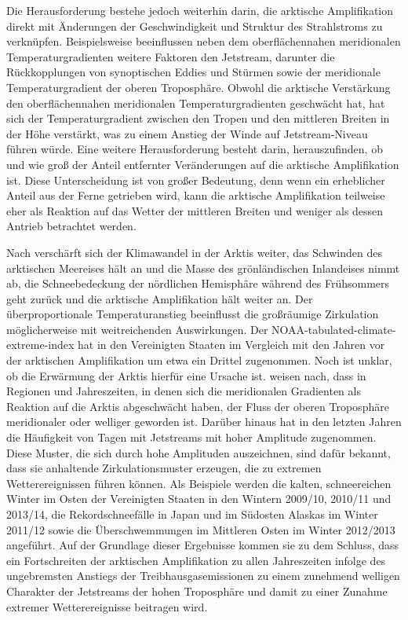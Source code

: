 Die Herausforderung bestehe jedoch weiterhin darin, die arktische Amplifikation direkt mit Änderungen der Geschwindigkeit und Struktur des Strahlstroms zu verknüpfen. Beispielsweise beeinflussen neben dem oberflächennahen meridionalen Temperaturgradienten weitere Faktoren den Jetstream, darunter die Rückkopplungen von synoptischen Eddies und Stürmen sowie der meridionale Temperaturgradient der oberen Tro\-po\-sphä\-re. Obwohl die arktische Verstärkung den oberflächennahen meridionalen Temperaturgradienten geschwächt hat, hat sich der Temperaturgradient zwischen den Tropen und den mittleren Breiten in der Höhe verstärkt, was zu einem Anstieg der Winde auf Jetstream-Niveau führen würde. Eine weitere Herausforderung besteht darin, herauszufinden, ob und wie groß der Anteil entfernter Veränderungen auf die arktische Amplifikation ist. Diese Unterscheidung ist von großer Bedeutung, denn wenn ein erheblicher Anteil aus der Ferne getrieben wird, kann die arktische Amplifikation teilweise eher als Reaktion auf das Wetter der mittleren Breiten und weniger als dessen Antrieb betrachtet werden.

Nach \citet{francis-2015} verschärft sich der Klimawandel in der Arktis weiter, das Schwinden des arktischen Meereises hält an und die Masse des grönländischen Inlandeises nimmt ab, die Schneebedeckung der nördlichen Hemisphäre während des Frühsommers geht zurück und die arktische Amplifikation hält weiter an. Der überproportionale Temperaturanstieg beeinflusst die großräumige Zirkulation möglicherweise mit weitreichenden Auswirkungen. Der NOAA-tabulated-climate-extreme-index \citep{karl-1996} hat in den Vereinigten Staaten im Vergleich mit den Jahren vor der arktischen Amplifikation um etwa ein Drittel zugenommen. Noch ist unklar, ob die Erwärmung der Arktis hierfür eine Ursache ist. \citet{francis-2015} weisen nach, dass in Regionen und Jahreszeiten, in denen sich die meridionalen Gradienten als Reaktion auf die Arktis abgeschwächt haben, der Fluss der oberen Troposphäre meridionaler oder welliger geworden ist. Darüber hinaus hat in den letzten Jahren die Häufigkeit von Tagen mit  Jetstreams mit hoher Amplitude zugenommen. Diese Muster, die sich durch hohe Amplituden auszeichnen, sind dafür bekannt, dass sie anhaltende Zirkulationsmuster erzeugen, die zu extremen Wetterereignissen führen können. Als Beispiele werden die kalten, schneereichen Winter im Osten der Vereinigten Staaten in den Wintern 2009/10, 2010/11 und 2013/14, die Rekordschneefälle in Japan und im Südosten Alaskas im Winter 2011/12 sowie die Überschwemmungen im Mittleren Osten im Winter 2012/2013 angeführt. Auf der Grundlage dieser Ergebnisse kommen sie zu dem Schluss, dass ein Fortschreiten der arktischen Amplifikation zu allen Jahreszeiten infolge des ungebremsten Anstiegs der Treibhausgasemissionen zu einem zunehmend welligen Charakter der Jetstreams der hohen Troposphäre und damit zu einer Zunahme extremer Wetterereignisse beitragen wird.

